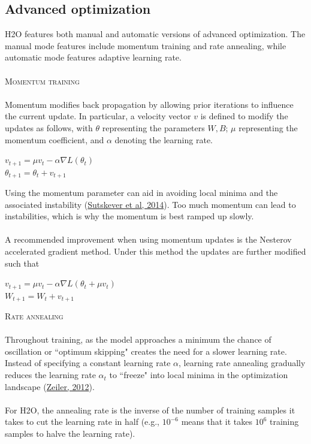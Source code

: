 \documentclass[12pt]{article}
\begin{document}
\subsection{Advanced optimization}
H2O features both manual and automatic versions of advanced optimization. The manual mode features include momentum training and rate annealing, while automatic mode features adaptive learning rate.
\\
\\
\textsc{Momentum training}
\\
\\
\noindent
Momentum modifies back propagation by allowing prior iterations to influence the current update. In particular, a velocity vector $v$ is defined to modify the updates as follows, with $\theta$ representing the parameters $W,B$; $\mu$ representing the momentum coefficient, and $\alpha$ denoting 
the learning rate. 
\begin{center}
$v_{t+1} = \mu v_t - \alpha \nabla L(\theta_t)$
\\
$\theta_{t+1} = \theta_t + v_{t+1}$
\end{center}
Using the momentum parameter can aid in avoiding 
local minima and the associated instability (\href{http://www.cs.toronto.edu/~fritz/absps/momentum.pdf}{Sutskever et al, 2014}). Too much momentum can lead to instabilities, which is why the momentum is best ramped up slowly.
\\
\\
A recommended improvement when using momentum updates is the Nesterov accelerated gradient method. Under this method the updates are further modified such that 
\begin{center}
$v_{t+1} = \mu v_t - \alpha \nabla L(\theta_t + \mu v_t)$
\\
$W_{t+1} = W_t + v_{t+1}$
\end{center}
\textsc{Rate annealing}
\\
\\
\noindent
Throughout training, as the model approaches a minimum the chance of oscillation or ``optimum skipping" creates the need for a slower learning rate. Instead of specifying a constant learning rate $\alpha$, learning rate annealing gradually reduces the learning rate $\alpha_t$ to ``freeze" into local minima in the optimization landscape (\href{http://arxiv.org/pdf/1212.5701v1.pdf}{Zeiler, 2012}).  
\\
\\
For H2O, the annealing rate is the inverse of the number of training samples it takes to cut the learning rate in half (e.g., $10^{-6}$ means that it takes $10^6$ training samples to halve the learning rate).
\end{document}

